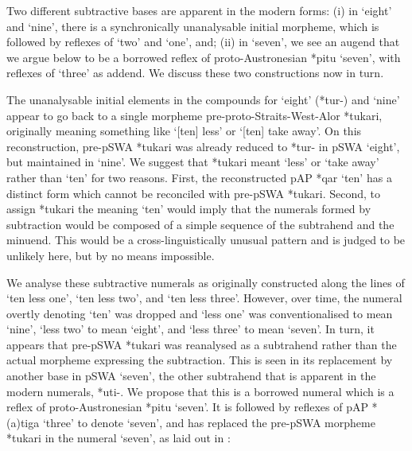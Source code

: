 \let\eachwordone=\it
\let\eachwordtwo=\rm
\let\eachwordthree=\rm
\let\eachwordfour=\rm
\let\eachwordfive=\rm
\let\eachwordsix=\rm
\let\eachwordseven=\rm


Two different subtractive bases are apparent in the modern forms: (i) in `eight' and `nine', there is a synchronically unanalysable initial morpheme, which is followed by reflexes of `two' and `one', and; (ii) in `seven', we see an augend that we argue below to be a borrowed reflex of proto-Austronesian *pitu `seven', with reflexes of `three' as addend. We discuss these two constructions now in turn.

The unanalysable initial elements in the compounds for `eight' (*tur-) and `nine' appear to go back to a single morpheme pre-proto-Straits-West-Alor *tukari, originally meaning something like `[ten] less' or `[ten] take away'. On this reconstruction, pre-pSWA *tukari was already reduced to *tur- in pSWA `eight', but maintained in `nine'. We suggest that *tukari meant `less' or `take away' rather than `ten' for two reasons. First, the reconstructed pAP *qar `ten' \citep{HoltonEtAl2012} has a distinct form which cannot be reconciled with pre-pSWA *tukari. Second, to assign *tukari the meaning `ten' would imply that the numerals formed by subtraction would be composed of a simple sequence of the subtrahend and the minuend. This would be a cross-linguistically unusual pattern and is judged to be unlikely here, but by no means impossible. 

We analyse these subtractive numerals as originally constructed along the lines of `ten less one', `ten less two', and `ten less three'. However, over time, the numeral overtly denoting `ten' was dropped and `less one' was conventionalised to mean `nine', `less two' to mean `eight', and `less three' to mean `seven'. In turn, it appears that pre-pSWA *tukari was reanalysed as a subtrahend rather than the actual morpheme expressing the subtraction. This is seen in its replacement by another base in pSWA `seven', the other subtrahend that is apparent in the modern numerals, *{\texthtb}uti-. We propose that this is a borrowed numeral which is a reflex of proto-Austronesian *pitu `seven'. It is followed by reflexes of pAP *(a)tiga `three' to denote `seven', and has replaced the pre-pSWA morpheme *tukari in the numeral `seven', as laid out in :

